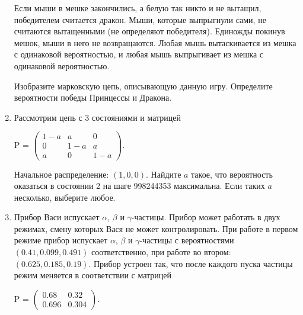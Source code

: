 \documentclass[a4paper, 14pt]{extarticle}
\begin{document}
\begin{enumerate}
Если мыши в мешке закончились, а белую так никто и не вытащил, победителем считается дракон. Мыши, которые выпрыгнули сами, не считаются вытащенными (не определяют победителя). Единожды покинув мешок, мыши в него не возвращаются. Любая мышь вытаскивается из мешка с одинаковой вероятностью, и любая мышь выпрыгивает из мешка с одинаковой вероятностью.

Изобразите марковскую цепь, описывающую данную игру. Определите вероятности победы Принцессы и Дракона.

\item Рассмотрим цепь с 3 состояниями и матрицей

\begin{center}
    P = $\left ( \begin{array}{ccc}
        1 - a & a & 0 \\
        0 & 1 - a & a \\
        a & 0 & 1 - a
    \end{array} \right ).$
\end{center}

Начальное распределение: $\left ( 1, 0, 0 \right )$. Найдите $a$ такое, что вероятность оказаться в состоянии 2 на шаге 998244353 максимальна. Если таких $a$ несколько, выберите любое.

\item Прибор Васи испускает $\alpha$, $\beta$ и $\gamma$-частицы. Прибор может работать в двух режимах, смену которых Вася не может контролировать. При работе в первом режиме прибор испускает $\alpha$, $\beta$ и $\gamma$-частицы с вероятностями $\left ( 0.41, 0.099, 0.491 \right )$ соответственно, при работе во втором: $\left ( 0.625, 0.185, 0.19 \right )$. Прибор устроен так, что после каждого пуска частицы режим меняется в соответствии с матрицей

\begin{center}
    P = $\left ( \begin{array}{cc}
        0.68 & 0.32 \\
        0.696 & 0.304
    \end{array} \right ).$
\end{center}


\end{enumerate}
\end{document}
